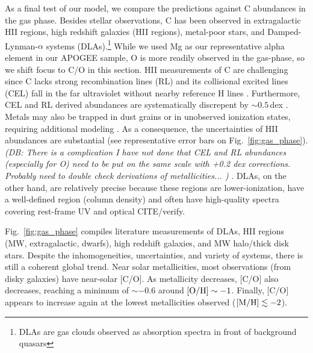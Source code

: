\documentclass[fleqn,
usenatbib]{mnras}
\newcommand{\about}[1]{${\sim} #1$}
\newcommand{\dbnote}[1]{ {\color{Thistle} \textit{\small (DB: #1)}} }
\begin{document}
As a final test of our model, we compare the predictions against C abundances
in the gas phase. Besides stellar observations, C has been observed in extragalactic HII regions, high redshift galaxies (HII regions), metal-poor stars, and Damped-Lynman-$\alpha$ systems (DLAs).\footnote{DLAs are gas clouds observed as absorption spectra in front of background quasars}
While we used Mg as our representative alpha element in our APOGEE sample, O
is more readily observed in the gas-phase, so we shift focus to C/O in this
section.
HII measurements of C are challenging since C lacks strong recombination lines (RL)
 and its collisional excited lines (CEL) fall in the far ultraviolet without nearby reference H lines \citep[][]{skillman+20}.
Furthermore, CEL and RL derived abundances are systematically discrepent by \about{0.5}\,dex \citep{GR07}.
Metals may also be trapped in dust grains or in unobserved ionization states, requiring additional modeling \citep{MM19}.
As a consequence, the uncertainties of HII abundances are substantial (see representative error bars on Fig.~\ref{fig:gas_phase}).
\dbnote{
There is a complication I have not done that CEL and RL abundances (especially for O) need to be put on the same scale with +0.2 dex corrections. Probably need to double check derivations of metallicities...
}. DLAs, on the other hand, are relatively precise because these regions are lower-ionization, have a well-defined region (column density) and often have high-quality spectra covering rest-frame UV and optical {\color{red} CITE/verify}.

Fig.~\ref{fig:gas_phase} compiles literature measurements of DLAs, HII regions (MW, extragalactic, dwarfs), high redshift galaxies, and MW halo/thick disk stars. Despite the inhomogeneities, uncertainties, and variety of systems, there is still a coherent global trend.
Near solar metallicities, most observations (from disky galaxies) have near-solar [C/O].
As metallicity decreases, [C/O] also decreases, reaching a minimum of \about{-0.6} around ${\rm [O/H] \sim -1}$. Finally, [C/O] appears to increase again at the lowest metallicities observed (${\rm [M/H] \lesssim -2}$).
\end{document}
